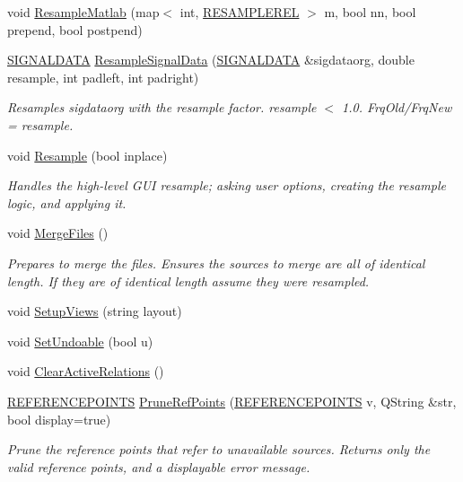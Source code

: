 \begin{CompactItemize}
void \hyperlink{class_main_window_2e4c88aec42d6244ceaf0ac564d43f23}{ResampleMatlab} (map$<$ int, \hyperlink{struct_r_e_s_a_m_p_l_e_r_e_l}{RESAMPLEREL} $>$ m, bool nn, bool prepend, bool postpend)
\item 
\hyperlink{class_s_i_g_n_a_l_d_a_t_a}{SIGNALDATA} \hyperlink{class_main_window_496968f7b572ee11dd55660040d98408}{ResampleSignalData} (\hyperlink{class_s_i_g_n_a_l_d_a_t_a}{SIGNALDATA} \&sigdataorg, double resample, int padleft, int padright)
\begin{CompactList}\small\item\em Resamples sigdataorg with the resample factor. resample $<$ 1.0. FrqOld/FrqNew = resample. \item\end{CompactList}\item 
void \hyperlink{class_main_window_956544786652cdf874a92139068e8bf3}{Resample} (bool inplace)
\begin{CompactList}\small\item\em Handles the high-level GUI resample; asking user options, creating the resample logic, and applying it. \item\end{CompactList}\item 
void \hyperlink{class_main_window_69efbc03c395ff2912037572ba655f6e}{MergeFiles} ()
\begin{CompactList}\small\item\em Prepares to merge the files. Ensures the sources to merge are all of identical length. If they are of identical length assume they were resampled. \item\end{CompactList}\item 
void \hyperlink{class_main_window_1f4b0bdd2132d9adde0f145c7b52476c}{SetupViews} (string layout)
\item 
void \hyperlink{class_main_window_9e278ca8917b0330d0f1606e7d188baa}{SetUndoable} (bool u)
\item 
void \hyperlink{class_main_window_988229efc0dea58df8ef6cd5d51a6854}{ClearActiveRelations} ()
\item 
\hyperlink{data_8h_7b296bba56ab2e0ad6167aadcafe80d2}{REFERENCEPOINTS} \hyperlink{class_main_window_95232bc23cf06fa64b767677ac13530c}{PruneRefPoints} (\hyperlink{data_8h_7b296bba56ab2e0ad6167aadcafe80d2}{REFERENCEPOINTS} v, QString \&str, bool display=true)
\begin{CompactList}\small\item\em Prune the reference points that refer to unavailable sources. Returns only the valid reference points, and a displayable error message. \item\end{CompactList}\item 

\end{CompactItemize}
